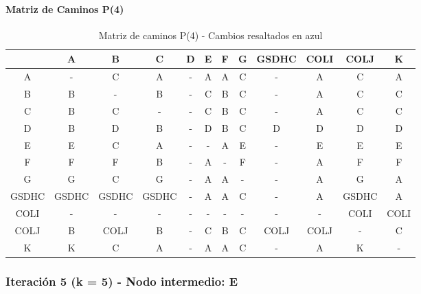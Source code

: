 \documentclass[12pt]{article}
\begin{document}
\paragraph{Matriz de Caminos P(4)}
\begin{table}[h!]
\centering
\begin{tabular}{|c|c|c|c|c|c|c|c|c|c|c|c|}
\hline
 & A & B & C & D & E & F & G & GSDHC & COLI & COLJ & K \\\hline
A & - & C & A & - & A & A & C & - & A & C & A \\\hline
B & B & - & B & - & C & B & C & - & A & C & C \\\hline
C & B & C & - & - & C & B & C & - & A & C & C \\\hline
D & B & D & B & - & D & B & C & D & D & D & D \\\hline
E & E & C & A & - & - & A & E & - & E & E & E \\\hline
F & F & F & B & - & A & - & F & - & A & F & F \\\hline
G & G & C & G & - & A & A & - & - & A & G & A \\\hline
GSDHC & GSDHC & GSDHC & GSDHC & - & A & A & C & - & A & GSDHC & A \\\hline
COLI & - & - & - & - & - & - & - & - & - & COLI & COLI \\\hline
COLJ & B & COLJ & B & - & C & B & C & COLJ & COLJ & - & C \\\hline
K & K & C & A & - & A & A & C & - & A & K & - \\\hline
\end{tabular}
\caption{Matriz de caminos P(4) - Cambios resaltados en azul}
\end{table}

\subsubsection{Iteración 5 (k = 5) - Nodo intermedio: E}
\end{document}

